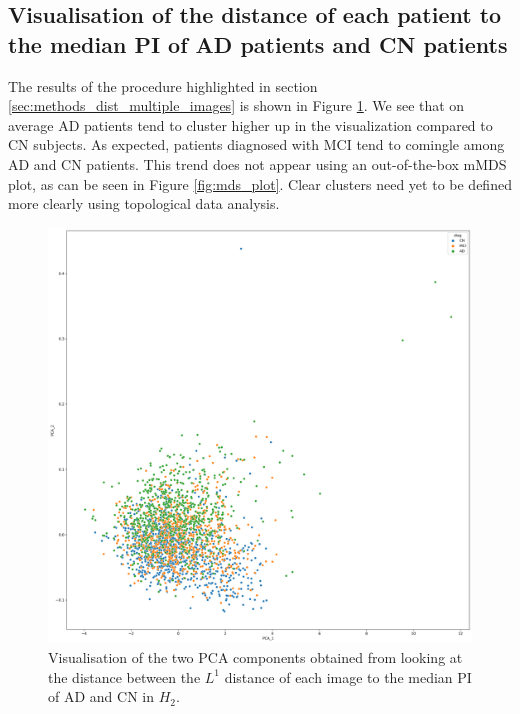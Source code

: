 \documentclass{article}
\begin{document}
\subsection{Visualisation of the distance of each patient to the median PI of AD patients and CN patients}

The results of the procedure highlighted in section \ref{sec:methods_dist_multiple_images} is shown
in Figure \ref{fig:vis_pca_ad_cn}. We see that on average AD patients tend to cluster higher up in
the visualization compared to CN subjects. As expected, patients diagnosed with MCI tend to
comingle among AD and CN patients. This trend does not appear using an out-of-the-box mMDS plot, as
can be seen in Figure \ref{fig:mds_plot}. Clear clusters need yet to be defined more clearly using topological
data analysis.

\begin{figure}[htb]
  \centering \includegraphics[width=\textwidth]{figures/cluster_CN_H_2_AD_H_2_PCA.png}
  \caption{Visualisation of the two PCA components obtained from looking at the distance between the
    $L^1$ distance of each image to the median PI of AD and CN in $H_2$.}
  \label{fig:vis_pca_ad_cn}
\end{figure}
\end{document}

